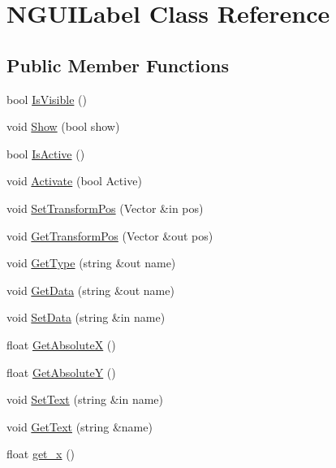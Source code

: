 \hypertarget{class_n_g_u_i_label}{}\section{N\+G\+U\+I\+Label Class Reference}
\label{class_n_g_u_i_label}
\subsection*{Public Member Functions}
\begin{DoxyCompactItemize}
\item 
bool \hyperlink{class_n_g_u_i_label_ad627b39f30bbd4bcea6f8bc33cf562cb}{Is\+Visible} ()
\item 
void \hyperlink{class_n_g_u_i_label_af15768407f2f219c0087c1c366ec62bf}{Show} (bool show)
\item 
bool \hyperlink{class_n_g_u_i_label_a3034e3b5322b4128adeb4c4d6453ce2b}{Is\+Active} ()
\item 
void \hyperlink{class_n_g_u_i_label_a8f090e250ca64f7a6c6af38b79fd9417}{Activate} (bool Active)
\item 
void \hyperlink{class_n_g_u_i_label_ac4907f8e5a3298c35291d4e1e2be2cde}{Set\+Transform\+Pos} (Vector \&in pos)
\item 
void \hyperlink{class_n_g_u_i_label_ab536a31c871fa87a04afe15e1cc553c3}{Get\+Transform\+Pos} (Vector \&out pos)
\item 
void \hyperlink{class_n_g_u_i_label_a999a7dd036dc64027a3be5bb79665baf}{Get\+Type} (string \&out name)
\item 
void \hyperlink{class_n_g_u_i_label_afaaaa017c5889e0803ca353a91d713c0}{Get\+Data} (string \&out name)
\item 
void \hyperlink{class_n_g_u_i_label_aeb9cc70bcb533a07b391afe536d75b10}{Set\+Data} (string \&in name)
\item 
float \hyperlink{class_n_g_u_i_label_aacbba8632c21f990165e4d64f8e48dda}{Get\+AbsoluteX} ()
\item 
float \hyperlink{class_n_g_u_i_label_ae973d4ccd77625e73b0e7b28fdcb89d1}{Get\+AbsoluteY} ()
\item 
void \hyperlink{class_n_g_u_i_label_a79f65e56bed8dc1a698d5fe1fa16d70e}{Set\+Text} (string \&in name)
\item 
void \hyperlink{class_n_g_u_i_label_a895ce6c61a2ea8957cbbf8878acad7ff}{Get\+Text} (string \&name)
\item 
float \hyperlink{class_n_g_u_i_label_a9aeedb64a9094289398a50b100d508d4}{get\+\_\+x} ()
\item 

\end{DoxyCompactItemize}
